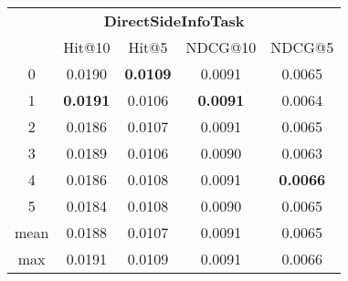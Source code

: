 \documentclass{article}
\begin{document}
 

\begin{tabular}{c|cccc}

\multicolumn{5}{c}{\textbf{DirectSideInfoTask}} \\
\noalign{\smallskip}
\noalign{\smallskip}
\toprule
\multicolumn{1}{c}{Template ID} & \multicolumn{1}{|c}{Hit@10} & \multicolumn{1}{c}{Hit@5} & \multicolumn{1}{c}{NDCG@10} & \multicolumn{1}{c}{NDCG@5} \\
\midrule
0 & 0.0190 & \textbf{0.0109} & 0.0091 & 0.0065 \\
1 & \textbf{0.0191} & 0.0106 & \textbf{0.0091} & 0.0064 \\
2 & 0.0186 & 0.0107 & 0.0091 & 0.0065 \\
3 & 0.0189 & 0.0106 & 0.0090 & 0.0063 \\
4 & 0.0186 & 0.0108 & 0.0091 & \textbf{0.0066} \\
5 & 0.0184 & 0.0108 & 0.0090 & 0.0065 \\
\midrule
mean & 0.0188 & 0.0107 & 0.0091 & 0.0065 \\
max & 0.0191 & 0.0109 & 0.0091 & 0.0066 \\
\bottomrule

\end{tabular}
\end{document}
